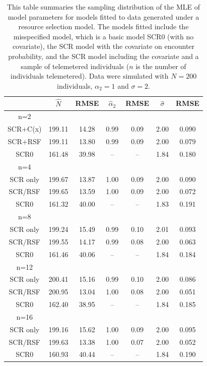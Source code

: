 \begin{table}[ht]
\centering
\caption{
  This table summaries the sampling distribution of the MLE of model
  parameters   for models fitted to data generated under a resource selection model.  The models fitted   include the misspecified model, which is a basic model SCR0 (with no covariate), the SCR model with
  the covariate on encounter probability, and the SCR model including
  the covariate and a sample of telemetered individuals ($n$ is the
  number of individuals telemetered).    Data were simulated with   $N=200$ individuals,
  $\alpha_{2} = 1$ and $\sigma = 2$.
}
\begin{tabular}{ccccccc} \hline \hline
        &  $\hat{N}$ &RMSE   &  $\hat{\alpha}_{2}$ &RMSE  &        $\hat{\sigma}$ & RMSE    \\ \hline
n=2     &       &       &       &      &        &         \\
SCR+C(x)& 199.11&  14.28&  0.99 &  0.09&   2.00 &  0.090  \\
SCR+RSF & 199.11&  13.80&  0.99 &  0.09&   2.00 &  0.079  \\
SCR0    & 161.48&  39.98&   --  &   -- &   1.84 &  0.180  \\ \hline
n=4   &       &      &        &    &        &          \\
SCR only& 199.67&  13.87&   1.00&   0.09 &  2.00&   0.090 \\
SCR/RSF & 199.65&  13.59&   1.00&   0.09 &  2.00&   0.072\\
SCR0    & 161.32&  40.00&    -- &    --  &  1.83&   0.191\\ \hline
n=8    &       &      &        &    &        &          \\
SCR only& 199.24&  15.49&   0.99&   0.10&   2.01&   0.093 \\
SCR/RSF & 199.55&  14.17&   0.99&   0.08&   2.00&   0.063\\
SCR0    & 161.46&  40.06&    -- &    -- &   1.84&   0.184\\ \hline
n=12    &       &      &        &    &        &          \\
SCR only& 200.41&  15.16&   0.99&   0.10&   2.00&   0.086\\
SCR/RSF & 200.95&  13.04&   1.00&   0.08&   2.00&   0.051\\
SCR0    & 162.40&  38.95&    -- &    -- &   1.84&   0.185\\ \hline
n=16     &       &      &        &    &        &          \\
SCR only &199.16 & 15.62&   1.00 &  0.09&   2.00&   0.095 \\
SCR/RSF  &199.63 & 13.38&   1.00 &  0.07&   2.00&   0.052\\
SCR0     &160.93 & 40.44&    --  &   -- &   1.84&   0.190\\ \hline
\end{tabular}
\label{rsf.tab.sims}
\end{table}

